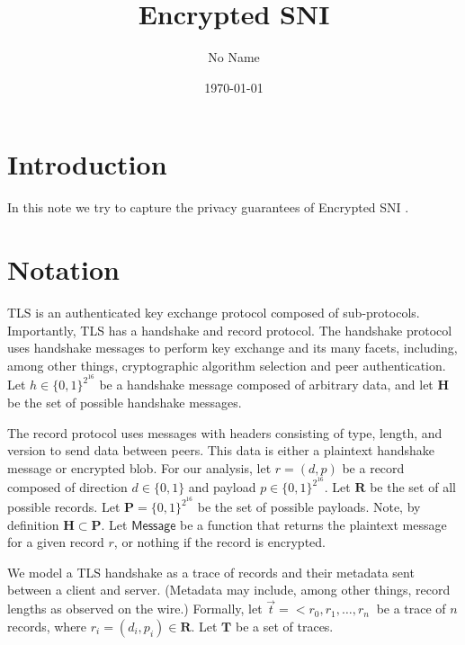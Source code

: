 \documentclass{article}
\title{Encrypted SNI}
\author{No Name}
\date{\today}
\begin{document}
\maketitle

\section{Introduction}

In this note we try to capture the privacy guarantees of Encrypted SNI \cite{ietf-tls-esni-04}.


\section{Notation}


TLS is an authenticated key exchange protocol composed of sub-protocols. Importantly, TLS has
a handshake and record protocol. The handshake protocol uses handshake messages to perform
key exchange and its many facets, including, among other things, cryptographic algorithm
selection and peer authentication. Let $h \in \{0,1\}^{2^{16}}$ be a handshake message 
composed of arbitrary data, and let $\mathbf{H}$ be the set of possible handshake messages.

The record protocol uses messages with headers consisting 
of type, length, and version to send data between peers. This data is either a plaintext 
handshake message or encrypted blob. For our analysis, let $r = (d, p)$ be a 
record composed of direction $d \in \{0,1\}$ and payload $p \in \{0,1\}^{2^{16}}$. Let
$\mathbf{R}$ be the set of all possible records. Let $\mathbf{P} = \{0,1\}^{2^{16}}$ 
be the set of possible payloads. Note, by definition $\mathbf{H} \subset \mathbf{P}$.
Let $\mathsf{Message}$ be a function that returns the plaintext message for a given
record $r$, or nothing if the record is encrypted.

We model a TLS handshake as a trace of records and their metadata sent between a client and server. 
(Metadata may include, among other things, record lengths as observed on the wire.) 
Formally, let $\vec{t} = <r_0, r_1, \dots, r_n\>$ be a trace of $n$ records, where 
$r_i = (d_i, p_i) \in \mathbf{R}$. Let $\mathbf{T}$ be a set of traces. 
\end{document}
